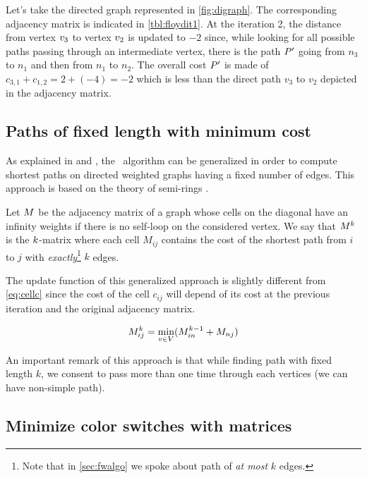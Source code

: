

Let's take the directed graph represented in \cref{fig:digraph}. The corresponding adjacency matrix is indicated in \cref{tbl:floydit1}. At the iteration 2, the distance from vertex $v_3$ to vertex $v_2$ is updated to $-2$ since, while looking for all possible paths passing through an intermediate vertex, there is the path $P'$ going from $n_3$ to $n_1$ and then from $n_1$ to $n_2$. The overall cost $P'$ is made of $c_{3,1} + c_{1,2} = 2 + (-4) = -2$ which is less than the direct path $v_3$ to $v_2$ depicted in the adjacency matrix.

\subsection{Paths of fixed length with minimum cost}

As explained in \cite{floydGeneric} and \cite{cpweb}, the \FW\ algorithm can be generalized in order to compute shortest paths on directed weighted graphs having a fixed number of edges. This approach is based on the theory of semi-rings \cite{ullman}.

Let $M$ be the adjacency matrix of a graph whose cells on the diagonal have an infinity weights if there is no self-loop on the considered vertex. We say that $M^k$ is the $k$-matrix where each cell $M_{ij}$ contains the cost of the shortest path from $i$ to $j$ with \textit{exactly}\footnote{Note that in \cref{sec:fwalgo} we spoke about path of \textit{at most} $k$ edges.} $k$ edges.

The update function of this generalized approach is slightly different from \cref{eq:cellc} since the cost of the cell $c_{ij}$ will depend of its cost at the previous iteration and the original adjacency matrix.

\begin{equation}
  M^k_{ij} = \min_{v \in V} (M^{k-1}_{in} + M_{nj})
\end{equation}

An important remark of this approach is that while finding path with fixed length $k$, we consent to pass more than one time through each vertices (\ie we can have non-simple path).

\subsection{Minimize color switches with matrices}
\label{sec:algo_matrix}

